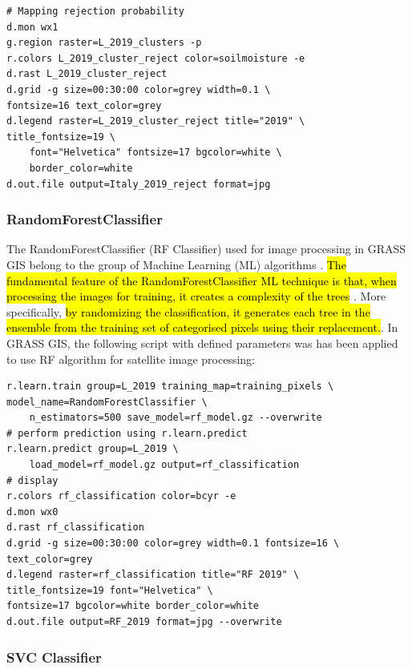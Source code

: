 \documentclass[eprint,
approc,		%
]{actapoly}
\begin{document}
\begin{footnotesize}
\begin{verbatim}
# Mapping rejection probability
d.mon wx1
g.region raster=L_2019_clusters -p
r.colors L_2019_cluster_reject color=soilmoisture -e
d.rast L_2019_cluster_reject
d.grid -g size=00:30:00 color=grey width=0.1 \
fontsize=16 text_color=grey
d.legend raster=L_2019_cluster_reject title="2019" \
title_fontsize=19 \
	font="Helvetica" fontsize=17 bgcolor=white \
	border_color=white
d.out.file output=Italy_2019_reject format=jpg
\end{verbatim}
\end{footnotesize}

\subsubsection{RandomForestClassifier}

The RandomForestClassifier (RF Classifier) used for image processing in GRASS GIS belong to the group of Machine Learning (ML) algorithms\hl{ }\citep{598994}. \hl{The fundamental feature of the RandomForestClassifier ML technique is that, when processing the images for training, it creates a complexity of the trees} \citep{990132}. More specifically, \hl{by randomizing the classification, it generates each tree in the ensemble from the training set of categorised pixels using their replacement.}. In GRASS GIS, the following script with defined parameters was has been applied to use RF algorithm for satellite image processing: 

\begin{footnotesize}
\begin{verbatim}
r.learn.train group=L_2019 training_map=training_pixels \
model_name=RandomForestClassifier \
    n_estimators=500 save_model=rf_model.gz --overwrite
# perform prediction using r.learn.predict
r.learn.predict group=L_2019 \
	load_model=rf_model.gz output=rf_classification 
# display
r.colors rf_classification color=bcyr -e
d.mon wx0
d.rast rf_classification
d.grid -g size=00:30:00 color=grey width=0.1 fontsize=16 \
text_color=grey
d.legend raster=rf_classification title="RF 2019" \
title_fontsize=19 font="Helvetica" \
fontsize=17 bgcolor=white border_color=white
d.out.file output=RF_2019 format=jpg --overwrite
\end{verbatim}
\end{footnotesize}

\subsubsection{SVC Classifier}
\end{document}
